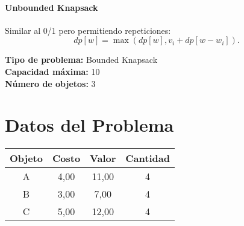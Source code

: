 \documentclass{article}
\begin{document}
\paragraph{Unbounded Knapsack} Similar al 0/1 pero permitiendo repeticiones:
\[
dp[w] = \max ( dp[w], v_i + dp[w - w_i] ).
\]

\thispagestyle{empty}
\newpage
\textbf{Tipo de problema:} Bounded Knapsack\\
\textbf{Capacidad máxima:} 10\\
\textbf{Número de objetos:} 3\\

\section*{Datos del Problema}
\begin{tabular}{|c|c|c|c|}
\hline
Objeto & Costo & Valor & Cantidad \\
\hline
A & 4,00 & 11,00 & 4 \\
B & 3,00 & 7,00 & 4 \\
C & 5,00 & 12,00 & 4 \\
\hline
\end{tabular}
\end{document}
